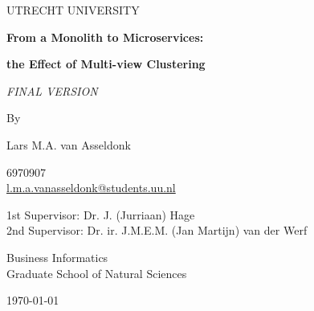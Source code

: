 \documentclass[12pt]{report}
\begin{document}
\begin{titlepage}
    \begin{center}
    
    \vspace*{2cm}
    UTRECHT UNIVERSITY
    
    \vspace*{2.5cm}
    
    {\Huge \textbf{From a Monolith to Microservices:}}
    
    \vspace{0.6cm}
    
    {\Huge \textbf{the Effect of Multi-view Clustering}}
    
    \vspace{0.5cm}
    
    {\small \textit{FINAL VERSION}}
    
    
    \vspace{1.5cm}
    
    {\Large By}
    
    \vspace{0.4cm}
    
    {\Large Lars M.A. van Asseldonk}
    
    \vspace{1cm}
    
    6970907\\
    \href{mailto:l.m.a.vanasseldonk@students.uu.nl}{l.m.a.vanasseldonk@students.uu.nl}
    
    \vfill
    
    1st Supervisor: Dr. J. (Jurriaan) Hage \\
    2nd Supervisor: Dr. ir. J.M.E.M. (Jan Martijn) van der Werf
    
    \vspace{2cm}
    
    Business Informatics\\
    Graduate School of Natural Sciences\\
    
    \vspace{1cm}
    
    \today
    
    \end{center}
\end{titlepage}




\tableofcontents
\clearpage
\end{document}
